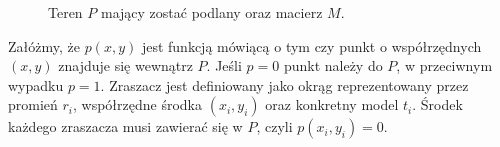 \documentclass[twoside]{iisthesis}
\begin{document}
\begin{figure}[!htb]
	\centering
	\caption{Teren $P$ mający zostać podlany oraz macierz $M$.}
	\label{fig:matrix_m}
\end{figure}
Załóżmy, że $p(x,y)$ jest funkcją mówiącą o tym czy punkt o współrzędnych $(x, y)$ znajduje się wewnątrz $P$. Jeśli $p = 0$ punkt należy do $P$, w przeciwnym wypadku $p=1$. Zraszacz jest definiowany jako okrąg reprezentowany przez promień $r_{i}$, współrzędne środka $(x_i, y_i)$ oraz konkretny model $t_{i}$. Środek każdego zraszacza musi zawierać się w $P$, czyli $p(x_{i}, y_{i}) = 0$.
\end{document}
